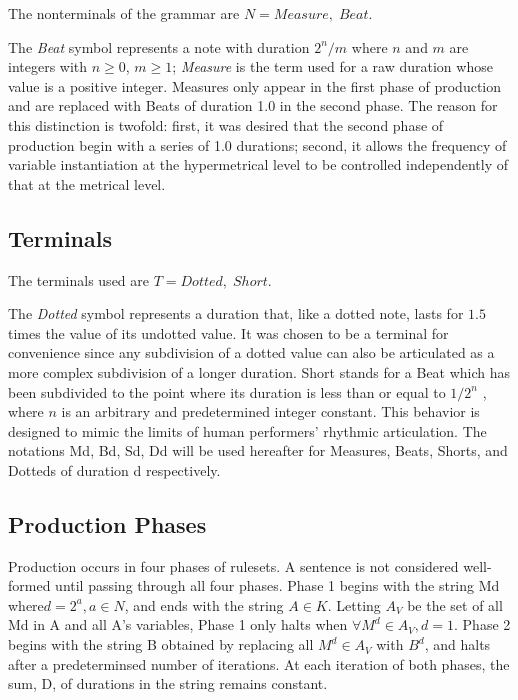 \documentclass{article}
\begin{document}
The nonterminals of the grammar are $N={Measure, \; Beat}$. 

The \emph{Beat} symbol represents a note with duration $2^n/m$ where $n$ and $m$ are integers with $n \geq 0$, $m \geq 1$; \emph{Measure} is the term used for a raw duration whose value is a positive integer. Measures only appear in the first phase of production and are replaced with Beats of duration 1.0 in the second phase. The reason for this distinction is twofold: first, it was desired that the second phase of production begin with a series of 1.0 durations; second, it allows the frequency of variable instantiation at the hypermetrical level to be controlled independently of that at the metrical level.


\subsection{Terminals}

The terminals used are $T={Dotted, \; Short}$.

The \emph{Dotted} symbol represents a duration that, like a dotted note, lasts for $1.5$ times the value of its undotted value. It was chosen to be a terminal for convenience since any subdivision of a dotted value can also be articulated as a more complex subdivision of a longer duration. Short stands for a Beat which has been subdivided to the point where its duration is less than or equal to $1/2^n$ , where $n$ is an arbitrary and predetermined integer constant. This behavior is designed to mimic the limits of human performers’ rhythmic articulation. The notations Md, Bd, Sd, Dd will be used hereafter for Measures, Beats, Shorts, and Dotteds of duration d respectively.

\subsection{Production Phases}

Production occurs in four phases of rulesets. A sentence is not considered well-formed until passing through all four phases. Phase 1 begins with the string Md where$ d=2^a, a \in N$, and ends with the string $A \in K$. Letting $A_V$ be the set of all Md in A and all A’s variables, Phase 1 only halts when $\forall M^d \in A_V, d=1$. Phase 2 begins with the string B obtained by replacing all $M^d \in A_V$ with $B^d$, and halts after a predeterminsed number of iterations. At each iteration of both phases, the sum, D, of durations in the string remains constant.
\end{document}
